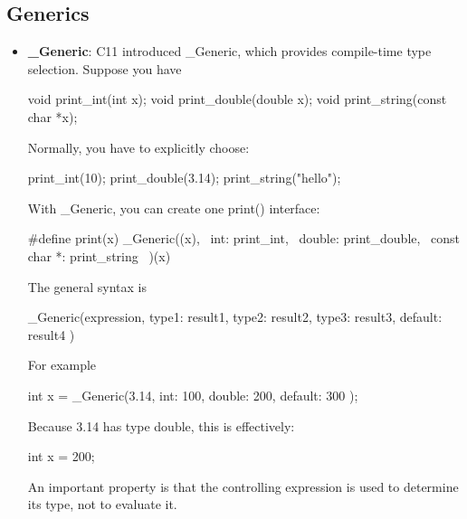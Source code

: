 \documentclass{report}
\begin{document}
        \pagebreak 
        \subsection{Generics}
        \begin{itemize}
            \item \textbf{\_Generic}: C11 introduced \_Generic, which provides compile-time type selection. Suppose you have
                \bigbreak \noindent 
                \begin{cppcode}
                    void print_int(int x);
                    void print_double(double x);
                    void print_string(const char *x);
                \end{cppcode}
                \bigbreak \noindent 
                Normally, you have to explicitly choose:
                \bigbreak \noindent 
                \begin{cppcode}
                    print_int(10);
                    print_double(3.14);
                    print_string("hello");
                \end{cppcode}
                \bigbreak \noindent 
                With \_Generic, you can create one print() interface:
                \bigbreak \noindent 
                \begin{cppcode}
                    #define print(x) _Generic((x), \
                        int:         print_int,    \
                        double:      print_double, \
                        const char *: print_string \
                    )(x)
                \end{cppcode}
                \bigbreak \noindent 
                The general syntax is 
                \bigbreak \noindent 
                \begin{cppcode}
                    _Generic(expression,
                        type1: result1,
                        type2: result2,
                        type3: result3,
                        default: result4
                    )
                \end{cppcode}
                \bigbreak \noindent 
                For example
                \bigbreak \noindent 
                \begin{cppcode}
                    int x = _Generic(3.14,
                        int:    100,
                        double: 200,
                        default: 300
                    );
                \end{cppcode}
                \bigbreak \noindent 
                Because 3.14 has type double, this is effectively:
                \bigbreak \noindent 
                \begin{cppcode}
                int x = 200;
                \end{cppcode}
                \bigbreak \noindent 
                An important property is that the controlling expression is used to determine its type, not to evaluate it.

        \end{itemize}
\end{document}
